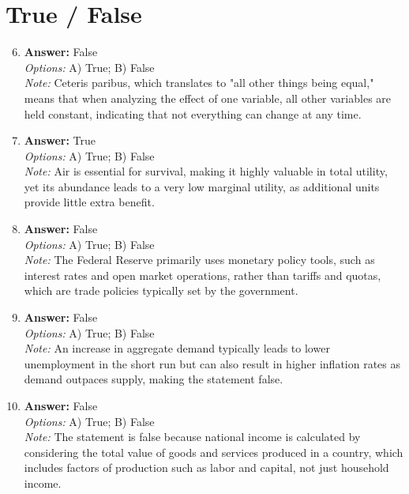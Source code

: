 \documentclass[12pt]{article}
\begin{document}
\section*{True / False}
\begin{enumerate}[label=\arabic*.]
\setcounter{enumi}{5}
\item \textbf{Answer:} False
\\ \textit{Options:} A) True; B) False
\\ \textit{Note:} Ceteris paribus, which translates to "all other things being equal," means that when analyzing the effect of one variable, all other variables are held constant, indicating that not everything can change at any time.
\item \textbf{Answer:} True
\\ \textit{Options:} A) True; B) False
\\ \textit{Note:} Air is essential for survival, making it highly valuable in total utility, yet its abundance leads to a very low marginal utility, as additional units provide little extra benefit.
\item \textbf{Answer:} False
\\ \textit{Options:} A) True; B) False
\\ \textit{Note:} The Federal Reserve primarily uses monetary policy tools, such as interest rates and open market operations, rather than tariffs and quotas, which are trade policies typically set by the government.
\item \textbf{Answer:} False
\\ \textit{Options:} A) True; B) False
\\ \textit{Note:} An increase in aggregate demand typically leads to lower unemployment in the short run but can also result in higher inflation rates as demand outpaces supply, making the statement false.
\item \textbf{Answer:} False
\\ \textit{Options:} A) True; B) False
\\ \textit{Note:} The statement is false because national income is calculated by considering the total value of goods and services produced in a country, which includes factors of production such as labor and capital, not just household income.
\end{enumerate}
\end{document}
